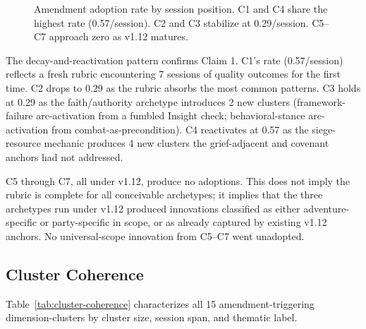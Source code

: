 \begin{figure}[t]
  \centering
  \caption{Amendment adoption rate by session position.
    C1 and C4 share the highest rate (0.57/session). C2 and C3 stabilize
    at 0.29/session. C5--C7 approach zero as v1.12 matures.}
  \label{fig:amendment-rate}
\end{figure}

The decay-and-reactivation pattern confirms Claim 1. C1's rate (0.57/session)
reflects a fresh rubric encountering 7 sessions of quality outcomes for the first
time. C2 drops to 0.29 as the rubric absorbs the most common patterns. C3 holds
at 0.29 as the faith/authority archetype introduces 2 new clusters
(framework-failure arc-activation from a fumbled Insight check; behavioral-stance
arc-activation from combat-as-precondition). C4 reactivates at 0.57 as the
siege-resource mechanic produces 4 new clusters the grief-adjacent and covenant
anchors had not addressed.

C5 through C7, all under v1.12, produce no adoptions. This does not imply the
rubric is complete for all conceivable archetypes; it implies that the three
archetypes run under v1.12 produced innovations classified as either
adventure-specific or party-specific in scope, or as already captured by
existing v1.12 anchors. No universal-scope innovation from C5--C7 went
unadopted.

\subsection{Cluster Coherence}

Table~\ref{tab:cluster-coherence} characterizes all 15 amendment-triggering
dimension-clusters by cluster size, session span, and thematic label.

